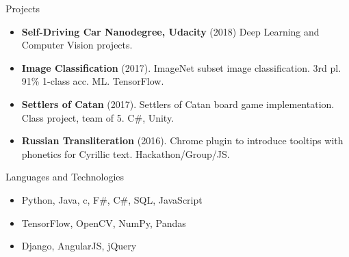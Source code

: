 \documentclass[]{muchicv}
\begin{document}
	\begin{cvsection}{Projects}
		\begin{cvsubsection}{}{}{}
			\begin{itemize}
				\item \textbf{Self-Driving Car Nanodegree, Udacity} (2018) Deep Learning and Computer Vision projects.
				\item \textbf{Image Classification} (2017). ImageNet subset image classification. 3rd pl. 91\% 1-class acc. ML. TensorFlow.
				\item \textbf{Settlers of Catan} (2017).  Settlers of Catan board game implementation. Class project, team of 5. C\#, Unity.
				\item \textbf{Russian Transliteration} (2016). Chrome plugin to introduce tooltips with phonetics for Cyrillic text. Hackathon/Group/JS.
			\end{itemize}
		\end{cvsubsection}
	\end{cvsection}
	
	\begin{cvsection}{Languages and Technologies}
		\begin{cvsubsection}{}{}{}	
			\begin{itemize}
				\item Python, Java, c, F\#, C\#, SQL, JavaScript 
				\item TensorFlow, OpenCV, NumPy, Pandas
				\item Django, AngularJS, jQuery
			\end{itemize}
		\end{cvsubsection}
	\end{cvsection}
	
\end{document}
